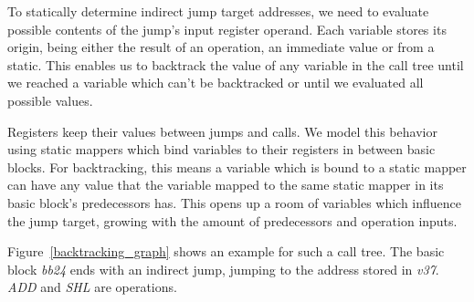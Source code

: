 \documentclass[course=eragp]{aspdoc}
\begin{document}
\par

To statically determine indirect jump target addresses, we need to evaluate possible contents of
the jump's input register operand. Each variable stores its origin, being either the result of an
operation, an immediate value or from a static. This enables us to backtrack the value of
any variable in the call tree until we reached a variable which can't be backtracked or until we evaluated
all possible values.

\par

Registers keep their values between jumps and calls. We model this behavior using static mappers
which bind variables to their registers in between basic blocks. For backtracking, this means a
variable which is bound to a static mapper can have any value that the variable mapped to the same
static mapper in its basic block's predecessors has. This opens up a room of variables which
influence the jump target, growing with the amount of predecessors and operation inputs.

\par

Figure~\ref{backtracking_graph} shows an example for such a call tree. The basic block \emph{bb24} ends
with an indirect jump, jumping to the address stored in \emph{v37}. \emph{ADD} and \emph{SHL} are operations.
\end{document}
